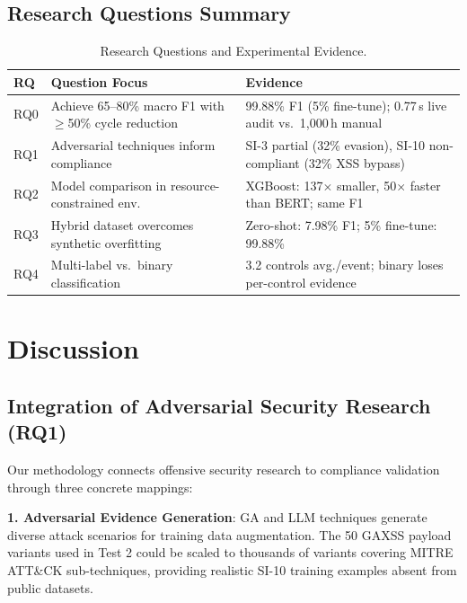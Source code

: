 \documentclass[futureinternet,article,submit,pdftex,moreauthors]{Definitions/mdpi}
\begin{document}
\subsection{Research Questions Summary}

\begin{table}[H]
\caption{Research Questions and Experimental Evidence.\label{tab:rq_summary}}
\begin{tabularx}{\textwidth}{lXX}
\toprule
\textbf{RQ} & \textbf{Question Focus} & \textbf{Evidence} \\
\midrule
RQ0 & Achieve 65--80\% macro F1 with $\geq$50\% cycle reduction & 99.88\% F1 (5\% fine-tune);
0.77\,s live audit vs.\ 1{,}000\,h manual \\
RQ1 & Adversarial techniques inform compliance & SI-3 partial (32\% evasion), SI-10
non-compliant (32\% XSS bypass) \\
RQ2 & Model comparison in resource-constrained env. & XGBoost: 137$\times$ smaller, 50$\times$
faster than BERT; same F1 \\
RQ3 & Hybrid dataset overcomes synthetic overfitting & Zero-shot: 7.98\% F1; 5\% fine-tune:
99.88\% \\
RQ4 & Multi-label vs.\ binary classification & 3.2 controls avg./event; binary loses
per-control evidence \\
\bottomrule
\end{tabularx}
\end{table}

\section{Discussion}
\label{sec:discussion}

\subsection{Integration of Adversarial Security Research (RQ1)}

Our methodology connects offensive security research to compliance validation through three
concrete mappings:

\textbf{1. Adversarial Evidence Generation}: GA and LLM techniques generate diverse attack
scenarios for training data augmentation. The 50 GAXSS payload variants used in Test 2 could
be scaled to thousands of variants covering MITRE ATT\&CK sub-techniques, providing realistic
SI-10 training examples absent from public datasets.
\end{document}
